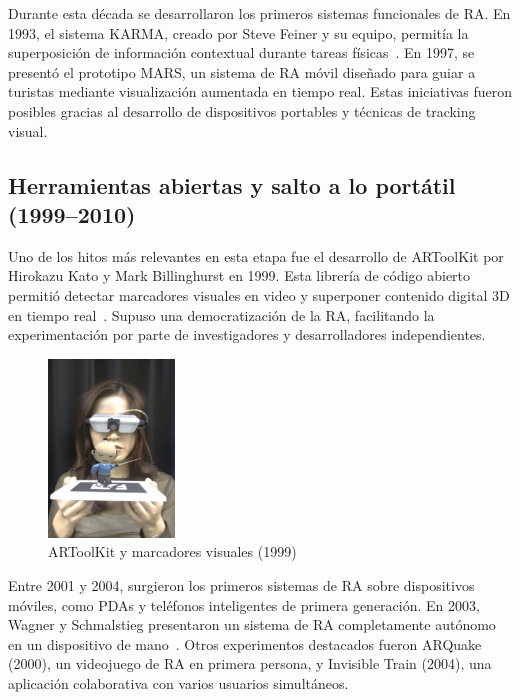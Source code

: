 Durante esta década se desarrollaron los primeros sistemas funcionales de RA. En 1993, el sistema KARMA, creado por Steve Feiner y su equipo, permitía la superposición de información contextual durante tareas físicas~\cite{feiner1993}. En 1997, se presentó el prototipo MARS, un sistema de RA móvil diseñado para guiar a turistas mediante visualización aumentada en tiempo real. Estas iniciativas fueron posibles gracias al desarrollo de dispositivos portables y técnicas de tracking visual.

\subsection{Herramientas abiertas y salto a lo portátil (1999–2010)}
Uno de los hitos más relevantes en esta etapa fue el desarrollo de ARToolKit por Hirokazu Kato y Mark Billinghurst en 1999. Esta librería de código abierto permitió detectar marcadores visuales en video y superponer contenido digital 3D en tiempo real~\cite{kato1999}. Supuso una democratización de la RA, facilitando la experimentación por parte de investigadores y desarrolladores independientes.

\begin{figure}[H]
    \centering
    \includegraphics[width=0.3\textwidth]{figs/artoolkit.jpg}
    \caption{ARToolKit y marcadores visuales (1999)}
    \label{fig:artoolkit}
\end{figure}

Entre 2001 y 2004, surgieron los primeros sistemas de RA sobre dispositivos móviles, como PDAs y teléfonos inteligentes de primera generación. En 2003, Wagner y Schmalstieg presentaron un sistema de RA completamente autónomo en un dispositivo de mano~\cite{wagner2003}. Otros experimentos destacados fueron ARQuake (2000), un videojuego de RA en primera persona, y Invisible Train (2004), una aplicación colaborativa con varios usuarios simultáneos.


